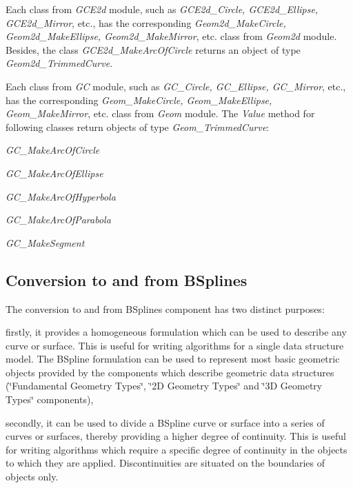 Each class from {\itshape G\+C\+E2d} module, such as {\itshape G\+C\+E2d\+\_\+\+Circle, G\+C\+E2d\+\_\+\+Ellipse, G\+C\+E2d\+\_\+\+Mirror}, etc., has the corresponding {\itshape Geom2d\+\_\+\+Make\+Circle, Geom2d\+\_\+\+Make\+Ellipse, Geom2d\+\_\+\+Make\+Mirror}, etc. class from {\itshape Geom2d} module. Besides, the class {\itshape G\+C\+E2d\+\_\+\+Make\+Arc\+Of\+Circle} returns an object of type {\itshape Geom2d\+\_\+\+Trimmed\+Curve}.

Each class from {\itshape GC} module, such as {\itshape G\+C\+\_\+\+Circle, G\+C\+\_\+\+Ellipse, G\+C\+\_\+\+Mirror}, etc., has the corresponding {\itshape Geom\+\_\+\+Make\+Circle, Geom\+\_\+\+Make\+Ellipse, Geom\+\_\+\+Make\+Mirror}, etc. class from {\itshape Geom} module. The {\itshape Value} method for following classes return objects of type {\itshape Geom\+\_\+\+Trimmed\+Curve}\+:
\begin{DoxyItemize}
\item {\itshape G\+C\+\_\+\+Make\+Arc\+Of\+Circle}
\item {\itshape G\+C\+\_\+\+Make\+Arc\+Of\+Ellipse}
\item {\itshape G\+C\+\_\+\+Make\+Arc\+Of\+Hyperbola}
\item {\itshape G\+C\+\_\+\+Make\+Arc\+Of\+Parabola}
\item {\itshape G\+C\+\_\+\+Make\+Segment}
\end{DoxyItemize}\hypertarget{occt_user_guides__modeling_data_occt_modat_1_3}{}\subsection{Conversion to and from B\+Splines}\label{occt_user_guides__modeling_data_occt_modat_1_3}
The conversion to and from B\+Splines component has two distinct purposes\+:
\begin{DoxyItemize}
\item firstly, it provides a homogeneous formulation which can be used to describe any curve or surface. This is useful for writing algorithms for a single data structure model. The B\+Spline formulation can be used to represent most basic geometric objects provided by the components which describe geometric data structures (\char`\"{}\+Fundamental Geometry Types\char`\"{}, \char`\"{}2\+D Geometry Types\char`\"{} and \char`\"{}3\+D Geometry Types\char`\"{} components),
\item secondly, it can be used to divide a B\+Spline curve or surface into a series of curves or surfaces, thereby providing a higher degree of continuity. This is useful for writing algorithms which require a specific degree of continuity in the objects to which they are applied. Discontinuities are situated on the boundaries of objects only.
\end{DoxyItemize}

